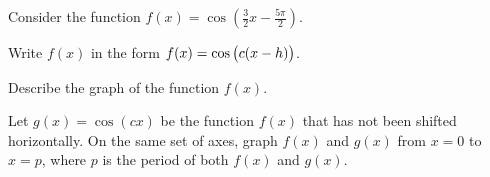 \documentclass[a4paper,oneside,12pt]{article}
\begin{document}
\begin{exercise}
Consider the function $f(x) = \cos(\frac{3}{2}x - \frac{5\pi}{2})$.
\begin{packedenum}
\item\label{subex:trigonometric:cos_right_shift_standard_form}
  Write $f(x)$ in the form $f(x) = \cos\big(c (x - h)\big)$.

\item\label{subex:trigonometric:cos_right_shift_5pi_3}
  Describe the graph of the function $f(x)$.

\item\label{subex:trigonometric:cos_right_shift_graph}
  Let $g(x) = \cos(cx)$ be the function $f(x)$ that has not been
  shifted horizontally.  On the same set of axes, graph $f(x)$ and
  $g(x)$ from $x = 0$ to $x = p$, where $p$ is the period of both
  $f(x)$ and $g(x)$.
\end{packedenum}
\end{exercise}
\end{document}
